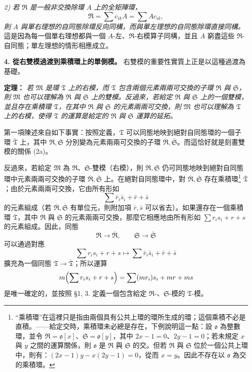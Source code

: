 \documentclass[11pt]{article}
\providecommand{\frR}{\mathfrak R}
\providecommand{\frS}{\mathfrak S}
\providecommand{\frT}{\mathfrak T}
\providecommand{\frM}{\mathfrak M}
\providecommand{\frako}{\mathfrak o}
\begin{document}
\emph{2) 若 \(\frR\) 是一般非交換除環 \(A\) 上的全矩陣環，}
\[
        \frR=\sum c_{ik}A=\sum A c_{ik},
\]
\emph{則 \(A\) 與單右理想的自同態除環反向同構，而與單左理想的自同態除環直接同構。} 這是因為每一個單右理想都與一個 \(A\)-左、\(\frR\)-右模算子同構，並且 \(A\) 窮盡這些 \(\frR\)-自同態；單左理想的情形相應成立。

\noindent\textbf{4. 從右雙模過渡到乘積環上的單側模。} 右雙模的重要性實質上正是以這種過渡為基礎。

\noindent\textbf{定理：} \emph{若 \(\frM\) 是環 \(\frT\) 上的右模，而 \(\frT\) 包含兩個元素兩兩可交換的子環 \(\frR\) 與 \(\frS\)，則 \(\frM\) 也可以理解為 \(\frR\) 與 \(\frS\) 上的雙模。反過來，若給定 \(\frR\) 與 \(\frS\) 上的一個雙模，並且存在乘積環 \(\frT\)，在其中 \(\frR\) 與 \(\frS\) 的元素兩兩可交換，則 \(\frM\) 也可以理解為 \(\frT\) 上的右模，使得 \(\frT\) 的運算是給定的 \(\frR\) 與 \(\frS\) 運算的延拓。}

第一項陳述來自如下事實：按照定義，\(\frT\) 可以同態地映到絕對自同態環的一個子環 \(\overline{\frT}\) 上，其中 \(\frR,\frS\) 分別變為元素兩兩可交換的子環 \(\overline{\frR},\overline{\frS}\)。而這恰好就是刻畫雙模的關係 (2a)。

反過來，若給定 \(\frM\) 為 \(\frR\)、\(\frS\)-雙模（右模），則 \(\frR,\frS\) 仍可同態地映到絕對自同態環中元素兩兩可交換的子環 \(\overline{\frR},\overline{\frS}\) 上。在絕對自同態環中，對 \(\overline{\frR},\overline{\frS}\) 存在乘積環\footnote{“乘積環”在這裡只是指由兩個具有公共上環的環所生成的環；這個乘積不必是直積。——給定交時，乘積環未必總是存在，下例說明這一點：設 \(\frako\) 為整數環，並令 \(\frR=\frako[x]\)、\(\frS=\frako[y]\)，其中 \(2x-1=0\)、\(2y-1=0\)；若未規定 \(x\) 與 \(y\) 之間的運算關係，則 \(\frako\) 是 \(\frR\) 與 \(\frS\) 的交。但若 \(\frR\) 與 \(\frS\) 位於一個公共上環中，則有：\((2x-1)y-x(2y-1)=0\)，從而 \(x=y\)。因此不存在以 \(\frako\) 為交的乘積環。} \(\overline{\frT}\)；由於元素兩兩可交換，它由所有形如
\[
        \sum \bar r_i\bar s_i+\bar r+\bar s
\]
的元素組成（若 \(\overline{\frR},\overline{\frS}\) 有單位元，則附加項 \(\bar r,\bar s\) 可以省去）。如果還存在一個乘積環 \(\frT\)，其中 \(\frR\) 與 \(\frS\) 的元素兩兩可交換，那麼它相應地由所有形如 \(\sum r_i s_i+r+s\) 的元素組成。因此，同態
\[
        \frR\to\overline{\frR},\qquad \frS\to\overline{\frS}
\]
可以通過對應
\[
        \sum r_i s_i+r+s
        \longmapsto
        \sum \bar r_i\bar s_i+\bar r+\bar s
\]
擴充為一個同態 \(\frT\to\overline{\frT}\)；所以運算
\[
        m\Bigl(\sum r_i s_i+r+s\Bigr)
        =\sum (m r_i)s_i+m r+m s
\]
是唯一確定的，並按照 §1, 3. 定義一個包含給定 \(\frR\)-、\(\frS\)-模的 \(\frT\)-模。
\end{document}
